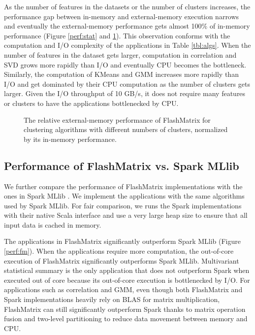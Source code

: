 As the number of features in the datasets or the number of clusters increases,
the performance gap between in-memory and external-memory execution
narrows and eventually the external-memory performance gets almost 100\%
of in-memory performance (Figure \ref{perf:stat} and \ref{perf:clust}).
This observation conforms with the computation and I/O complexity of
the applications in Table \ref{tbl:algs}. When the number of features
in the dataset gets larger, computation in correlation and SVD grows more
rapidly than I/O and eventually CPU becomes
the bottleneck. Similarly, the computation of KMeans and GMM increases
more rapidly than I/O and get dominated by their CPU computation as the number
of clusters gets larger. Given the I/O throughput of 10 GB/s, it does not
require many features or clusters to have the applications bottlenecked by
CPU.

\begin{figure}
	\begin{center}
		\footnotesize
		
		\caption{The relative external-memory performance of FlashMatrix for
			clustering algorithms with different numbers of clusters, normalized
		by its in-memory performance.}
		\label{perf:clust}
	\end{center}
\end{figure}

\subsection{Performance of FlashMatrix vs. Spark MLlib}

We further compare the performance of FlashMatrix implementations with the ones
in Spark MLlib \cite{mllib}. We implement the applications with
the same algorithms used by Spark MLlib. For fair comparison, we runs the Spark
implementations with their native Scala interface and use a very large heap size
to ensure that all input data is cached in memory.

The applications in FlashMatrix significantly outperform Spark MLlib (Figure
\ref{perf:fm}). When the applications require more computation, the out-of-core
execution of FlashMatrix significantly outperforms Spark MLlib. Multivariant
statistical summary is the only application that does not outperform Spark
when executed out of core because its out-of-core execution is bottlenecked
by I/O. For applications such as correlation and GMM, even though both FlashMatrix
and Spark implementations heavily rely on BLAS for matrix multiplication,
FlashMatrix can still significantly outperform Spark thanks to matrix operation
fusion and two-level partitioning to reduce data movement between memory and CPU.

